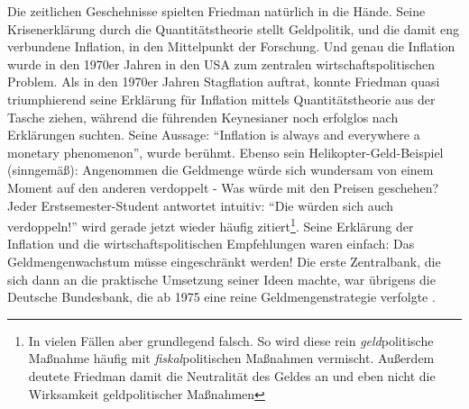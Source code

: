 Die zeitlichen Geschehnisse spielten Friedman natürlich in die Hände. Seine Krisenerklärung durch die Quantitätstheorie stellt Geldpolitik, und die damit eng verbundene Inflation, in den Mittelpunkt der Forschung. Und genau die Inflation wurde in den 1970er Jahren in den USA zum zentralen wirtschaftspolitischen Problem. Als in den 1970er Jahren Stagflation auftrat, konnte Friedman quasi triumphierend seine Erklärung für Inflation mittels Quantitätstheorie aus der Tasche ziehen, während die führenden Keynesianer noch erfolglos nach Erklärungen suchten. Seine Aussage: "`Inflation is always and everywhere a monetary phenomenon"', wurde berühmt. Ebenso sein Helikopter-Geld-Beispiel \parencite{Friedman1969} (sinngemäß): Angenommen die Geldmenge würde sich wundersam von einem Moment auf den anderen verdoppelt - Was würde mit den Preisen geschehen? Jeder Erstsemester-Student antwortet intuitiv: "`Die würden sich auch verdoppeln!"' wird gerade jetzt wieder häufig zitiert\footnote{In vielen Fällen aber grundlegend falsch. So wird diese rein \textit{geld}politische Maßnahme häufig mit \textit{fiskal}politischen Maßnahmen vermischt. Außerdem deutete Friedman damit die Neutralität des Geldes an und eben nicht die Wirksamkeit geldpolitischer Maßnahmen}. Seine Erklärung der Inflation und die wirtschaftspolitischen Empfehlungen waren einfach: Das Geldmengenwachstum müsse eingeschränkt werden!   
Die erste Zentralbank, die sich dann an die praktische Umsetzung seiner Ideen machte, war übrigens die Deutsche Bundesbank, die ab 1975 eine reine Geldmengenstrategie verfolgte \parencite[S. 36]{BBK2016}. 
